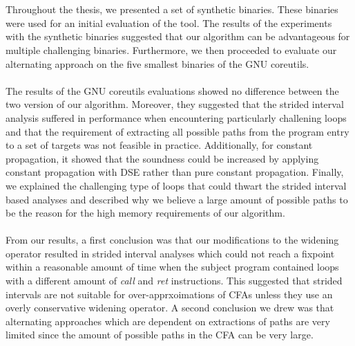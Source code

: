 \documentclass{kththesis}
\renewcommand{\it}[1]{\textit{#1}}
\begin{document}
\\ \\
Throughout the thesis, we presented a set of synthetic binaries. These binaries were used for an initial evaluation of the tool. The results of the experiments with the synthetic binaries suggested that our algorithm can be advantageous for multiple challenging binaries. Furthermore, we then proceeded to evaluate our alternating approach on the five smallest binaries of the GNU coreutils. 
\\ \\
The results of the GNU coreutils evaluations showed no difference between the two version of our algorithm. Moreover, they suggested that the strided interval analysis suffered in performance when encountering particularly challening loops and that the requirement of extracting all possible paths from the program entry to a set of targets was not feasible in practice. Additionally, for constant propagation, it showed that the soundness could be increased by applying constant propagation with DSE rather than pure constant propagation. Finally, we explained the challenging type of loops that could thwart the strided interval based analyses and described why we believe a large amount of possible paths to be the reason for the high memory requirements of our algorithm.
\\ \\
From our results, a first conclusion was that our modifications to the widening operator resulted in strided interval analyses which could not reach a fixpoint within a reasonable amount of time when the subject program contained loops with a different amount of \it{call} and \it{ret} instructions. This suggested that strided intervals are not suitable for over-apprxoimations of CFAs unless they use an overly conservative widening operator. A second conclusion we drew was that alternating approaches which are dependent on extractions of paths are very limited since the amount of possible paths in the CFA can be very large.
\end{document}
